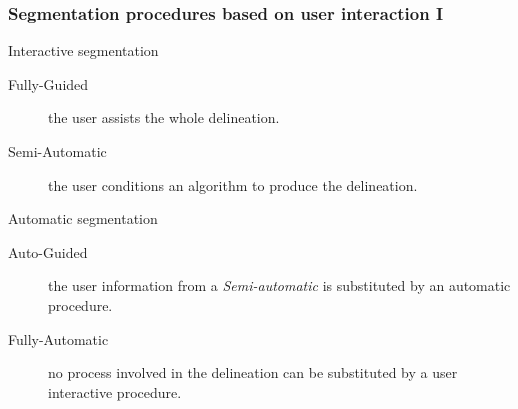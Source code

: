 
\begin{frame} \frametitle{Segmentation procedures based on user interaction I}
	\begin{block}{Interactive segmentation}
		\begin{description}
		 	\item[Fully-Guided] the user assists the whole delineation.
		 	\item[Semi-Automatic] the user conditions an algorithm to produce the delineation.
		\end{description}
	\end{block}
	\begin{block}{Automatic segmentation}
		\begin{description}
		 	\item[Auto-Guided] the user information from a \emph{Semi-automatic} is substituted by an automatic procedure.
		 	\item[Fully-Automatic] no process involved in the delineation can be substituted by a user interactive procedure.
		\end{description}

	\end{block}
\end{frame}

